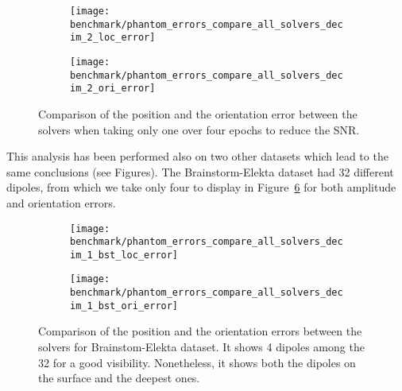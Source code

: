 \begin{figure}[p]
	\centering
    \begin{subfigure}{0.9\linewidth}
		\centering
		\texttt{[image: benchmark/phantom\_errors\_compare\_all\_solvers\_decim\_2\_loc\_error]}
	    \caption{\label{fig:all_solvers_loc_error_decim_4}}
    \end{subfigure}
	\hspace{5cm}
	\hfill
    \begin{subfigure}{0.9\linewidth}  
		\centering 
		\texttt{[image: benchmark/phantom\_errors\_compare\_all\_solvers\_decim\_2\_ori\_error]}
		\caption{\label{fig:all_solvers_ori_error_decim_4}}
	\end{subfigure}

		\caption{Comparison of the position and the orientation error between the solvers when taking only one over four epochs to reduce the SNR.\label{all_solvers_loc_error_decim_4}}
\end{figure}

This analysis has been performed also on two other datasets which lead to the same conclusions (see Figures). The Brainstorm-Elekta dataset had 32 different dipoles, from which we take only four to display in Figure~\ref{phantom_errors_compare_all_solvers_decim_1_bst_loc_error} for both amplitude and orientation errors.

\begin{figure}[p]
	\centering
    \begin{subfigure}{0.9\linewidth}
		\centering
		\texttt{[image: benchmark/phantom\_errors\_compare\_all\_solvers\_decim\_1\_bst\_loc\_error]}
	    \caption{\label{fig:phantom_errors_compare_all_solvers_decim_1_bst_loc_error}}
    \end{subfigure}
	\hspace{5cm}
	\hfill
    \begin{subfigure}{0.9\linewidth}  
		\centering 
		\texttt{[image: benchmark/phantom\_errors\_compare\_all\_solvers\_decim\_1\_bst\_ori\_error]}
		\caption{\label{fig:phantom_errors_compare_all_solvers_decim_1_bst_ori_error}}
	\end{subfigure}

		\caption{Comparison of the position and the orientation errors between the solvers for Brainstom-Elekta dataset. It shows 4 dipoles among the 32 for a good visibility. Nonetheless, it shows both the dipoles on the surface and the deepest ones.\label{phantom_errors_compare_all_solvers_decim_1_bst_loc_error}}
\end{figure}


